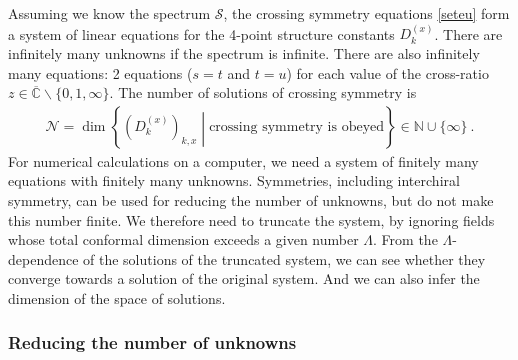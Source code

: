 \documentclass[12pt, a4paper]{article}
\begin{document}
Assuming we know the spectrum $\mathcal{S}$, the 
crossing symmetry equations \eqref{seteu} form a system of linear equations for the 4-point structure constants $D^{(x)}_k$. There are infinitely many unknowns if the spectrum is infinite. There are also infinitely many equations: 2 equations ($s=t$ and $t=u$) for each value of the cross-ratio $z\in \overline{\mathbb{C}}\backslash\{0,1,\infty\}$. The number of solutions of crossing symmetry is 
\begin{align}
 \mathcal{N} = \dim\left\{\left(D^{(x)}_k\right)_{k,x}\middle|\text{crossing symmetry is obeyed}\right\}\in \mathbb{N}\cup \{\infty\}\ . 
 \label{nsol}
\end{align}
For numerical calculations on a computer, we need a system of finitely many equations with finitely many unknowns. Symmetries, including interchiral symmetry, can be used for reducing the number of unknowns, but do not make this number finite. We therefore need to truncate the system, by ignoring fields whose total conformal dimension exceeds a given number $\Lambda$. From the $\Lambda$-dependence of the solutions of the truncated system, we can see whether they converge towards a solution of the original system. And we can also infer the dimension of the space of solutions. 

\subsubsection{Reducing the number of unknowns}
\end{document}
